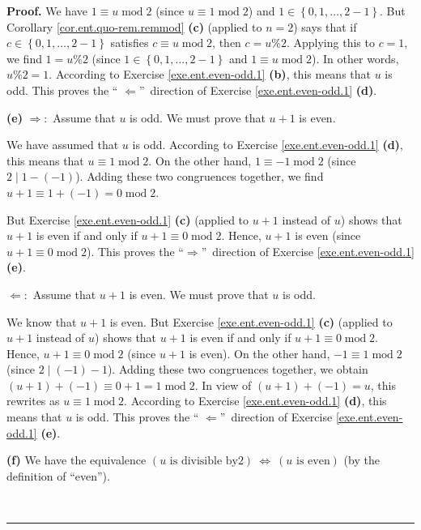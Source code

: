 \documentclass[numbers=enddot,12pt,final,onecolumn,notitlepage]{scrartcl}%
\numberwithin{exer}{subsection}
\theoremstyle{definition}
\newenvironment{fineprint}{\begin{small}}{\end{small}}
\newenvironment{proof}[1][Proof]{\noindent\textbf{#1.} }{\ \rule{0.5em}{0.5em}}
\begin{document}
\begin{fineprint}
\begin{proof}
We have $1\equiv u\operatorname{mod}2$ (since $u\equiv1\operatorname{mod}2$)
and $1\in\left\{  0,1,\ldots,2-1\right\}  $. But Corollary
\ref{cor.ent.quo-rem.remmod} \textbf{(c)} (applied to $n=2$) says that if
$c\in\left\{  0,1,\ldots,2-1\right\}  $ satisfies $c\equiv u\operatorname{mod}%
2$, then $c=u\%2$. Applying this to $c=1$, we find $1=u\%2$ (since
$1\in\left\{  0,1,\ldots,2-1\right\}  $ and $1\equiv u\operatorname{mod}2$).
In other words, $u\%2=1$. According to Exercise \ref{exe.ent.even-odd.1}
\textbf{(b)}, this means that $u$ is odd. This proves the \textquotedblleft%
$\Longleftarrow$\textquotedblright\ direction of Exercise
\ref{exe.ent.even-odd.1} \textbf{(d)}.

\textbf{(e)} $\Longrightarrow:$ Assume that $u$ is odd. We must prove that
$u+1$ is even.

We have assumed that $u$ is odd. According to Exercise
\ref{exe.ent.even-odd.1} \textbf{(d)}, this means that $u\equiv
1\operatorname{mod}2$. On the other hand, $1\equiv-1\operatorname{mod}2$
(since $2\mid1-\left(  -1\right)  $). Adding these two congruences together,
we find $u+1\equiv1+\left(  -1\right)  =0\operatorname{mod}2$.

But Exercise \ref{exe.ent.even-odd.1} \textbf{(c)} (applied to $u+1$ instead
of $u$) shows that $u+1$ is even if and only if $u+1\equiv0\operatorname{mod}%
2$. Hence, $u+1$ is even (since $u+1\equiv0\operatorname{mod}2$). This proves
the \textquotedblleft$\Longrightarrow$\textquotedblright\ direction of
Exercise \ref{exe.ent.even-odd.1} \textbf{(e)}.

$\Longleftarrow:$ Assume that $u+1$ is even. We must prove that $u$ is odd.

We know that $u+1$ is even. But Exercise \ref{exe.ent.even-odd.1} \textbf{(c)}
(applied to $u+1$ instead of $u$) shows that $u+1$ is even if and only if
$u+1\equiv0\operatorname{mod}2$. Hence, $u+1\equiv0\operatorname{mod}2$ (since
$u+1$ is even). On the other hand, $-1\equiv1\operatorname{mod}2$ (since
$2\mid\left(  -1\right)  -1$). Adding these two congruences together, we
obtain $\left(  u+1\right)  +\left(  -1\right)  \equiv0+1=1\operatorname{mod}%
2$. In view of $\left(  u+1\right)  +\left(  -1\right)  =u$, this rewrites as
$u\equiv1\operatorname{mod}2$. According to Exercise \ref{exe.ent.even-odd.1}
\textbf{(d)}, this means that $u$ is odd. This proves the \textquotedblleft%
$\Longleftarrow$\textquotedblright\ direction of Exercise
\ref{exe.ent.even-odd.1} \textbf{(e)}.

\textbf{(f)} We have the equivalence $\left(  u\text{ is divisible by
}2\right)  \ \Longleftrightarrow\ \left(  u\text{ is even}\right)  $ (by the
definition of \textquotedblleft even\textquotedblright).


\end{proof}
\end{fineprint}
\end{document}
